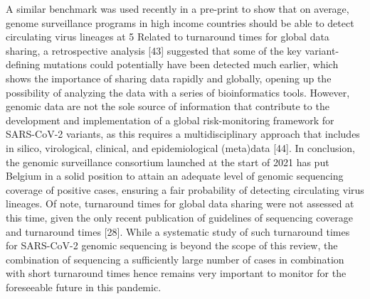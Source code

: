 A similar benchmark was used recently in a pre-print to show that on average, genome surveillance programs in high income countries should be able to detect circulating virus lineages at 5%
Related to turnaround times for global data sharing, a retrospective analysis [43] suggested that some of the key variant-defining mutations could potentially have been detected much earlier, which shows the importance of sharing data rapidly and globally, opening up the possibility of analyzing the data with a series of bioinformatics tools. However, genomic data are not the sole source of information that contribute to the development and implementation of a global risk-monitoring framework for SARS-CoV-2 variants, as this requires a multidisciplinary approach that includes in silico, virological, clinical, and epidemiological (meta)data [44].
In conclusion, the genomic surveillance consortium launched at the start of 2021 has put Belgium in a solid position to attain an adequate level of genomic sequencing coverage of positive cases, ensuring a fair probability of detecting circulating virus lineages. Of note, turnaround times for global data sharing were not assessed at this time, given the only recent publication of guidelines of sequencing coverage and turnaround times [28]. While a systematic study of such turnaround times for SARS-CoV-2 genomic sequencing is beyond the scope of this review, the combination of sequencing a sufficiently large number of cases in combination with short turnaround times hence remains very important to monitor for the foreseeable future in this pandemic.

